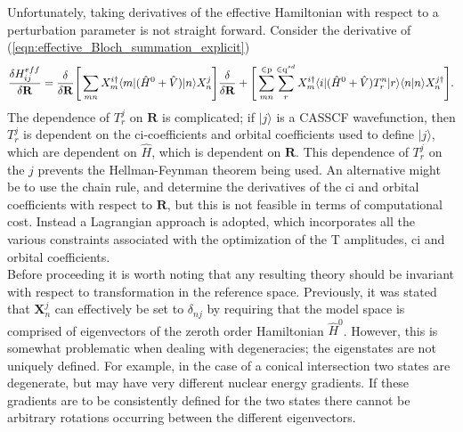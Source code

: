 \documentclass[12pt]{article}
\begin{document}
\noindent Unfortunately, taking derivatives
of the effective Hamiltonian with respect to a perturbation parameter is not
straight forward. Consider the derivative of (\ref{eqn:effective_Bloch_summation_explicit})
\begin{equation}
\frac{\delta H^{eff}_{ij}} {\delta \mathbf{R} } =
\frac{\delta } {\delta \mathbf{R} } \Bigg{[} \sum_{mn}
 X_{m}^{i\dagger}\langle m | (\hat{H}^{0} + \hat{V}) | n \rangle X_{n}^{j} \Bigg {]}
\frac{\delta } {\delta \mathbf{R} }
+ \Bigg{[}  
\sum_{mn}^{\in \mathrm{p} }\sum_{r}^{\in \mathrm{q}^{sd}}
 X_{m}^{i\dagger}
\langle i | (\hat{H}^{0}+\hat{V}) T^{n}_{r} |r \rangle\langle n | n \rangle
 X_{n}^{j\dagger}
 \Bigg {]}.
\label{eqn:effective_Bloch_summation_derivative}
\end{equation}
The dependence of $T^{j}_{r}$ on $\mathbf{R}$ is complicated; if $|j\rangle$ is a CASSCF wavefunction, then $T^{j}_{r}$ is
dependent on the ci-coefficients and orbital coefficients used to define $|j\rangle$, which are dependent on $\hat{H}$,
which is dependent on $\mathbf{R}$. This dependence of $T^{j}_{r}$ on the $j$ prevents the Hellman-Feynman theorem being used. 
An alternative might be to use the chain rule, and determine the derivatives of the ci and
orbital coefficients with respect to $\mathbf{R}$, but this is not feasible in terms of computational cost.
Instead a Lagrangian approach is adopted, which incorporates all the various constraints associated with the optimization 
of the T amplitudes, ci and orbital coefficients.\\

\noindent Before proceeding it is worth noting that any resulting theory should be invariant with 
respect to transformation in the reference space. Previously, it was stated that $\mathbf{X}_{n}^{j}$ 
can effectively be set to $\delta_{nj}$ by requiring that the model space is comprised of eigenvectors
of the zeroth order Hamiltonian $\hat{H}^{0}$. However, this is somewhat problematic when dealing with 
degeneracies; the eigenstates are not uniquely defined. For example, in the case of a conical intersection two states are
degenerate, but may have very different nuclear energy gradients. If these gradients are to
be consistently defined for the two states there cannot be arbitrary rotations occurring between the
different eigenvectors.\\
\end{document}
